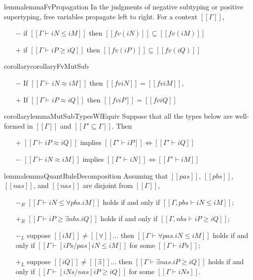 \begin{restatable}{lemma}{lemmaFvPropagation}
    \label{lemma:fv-propagation}
    In the judgments of negative subtyping or positive supertyping,
    free variables propagate left to right. For a context $[[Γ]]$,
    \begin{itemize}
        \item [$-$] if $[[Γ ⊢ iN ≤ iM]]$ then $[[fv(iN)]] \subseteq [[fv(iM)]]$
        \item [$+$] if $[[Γ ⊢ iP ≥ iQ]]$ then $[[fv(iP)]] \subseteq [[fv(iQ)]]$
    \end{itemize}
\end{restatable}

\begin{restatable}{corollary}{corollaryFvMutSub}
    \label{corollary:fv-mut-sub}
    \hfill
    \begin{itemize}
        \item [$-$] If $[[Γ ⊢ iN ≈ iM]]$ then $[[fv iN]] = [[fv iM]]$, 
        \item [$+$] If $[[Γ ⊢ iP ≈ iQ]]$ then $[[fv iP]] = [[fv iQ]]$
    \end{itemize}
\end{restatable}

\begin{restatable}{corollary}{lemmaMutSubTypesWfEquiv}
    \label{lemma:mut-sub-types-wf-equiv}
    Suppose that all the types below are well-formed in $[[Γ]]$ and
    $[[Γ' ⊆ Γ]]$. Then
    \begin{itemize}
    \item[$+$] $[[Γ ⊢ iP ≈ iQ]]$ implies $[[Γ' ⊢ iP]] \iff [[Γ' ⊢ iQ]]$
    \item[$-$] $[[Γ ⊢ iN ≈ iM]]$ implies $[[Γ' ⊢ iN]] \iff [[Γ' ⊢ iM]]$
    \end{itemize}
\end{restatable}

\begin{restatable}{lemma}{lemmaQuantRuleDecomposition}
    \label{lemma:quant-rule-decomposition}
    Assuming that $[[pas]]$, $[[pbs]]$, $[[nas]]$, and $[[nas]]$ are disjoint from $[[Γ]]$,
    \begin{itemize}
        \item [$-_{R}$] $[[Γ ⊢ iN ≤ ∀pbs.iM]]$ holds if and only if $[[Γ, pbs ⊢ iN ≤ iM]]$;
        \item [$+_{R}$] $[[Γ ⊢ iP ≥ ∃nbs.iQ]]$ holds if and only if $[[Γ, nbs ⊢ iP ≥ iQ]]$;
        \item [$-_{L}$] suppose $[[iM]] \neq [[∀]]\dots$
            then $[[Γ ⊢ ∀pas.iN ≤ iM]]$ holds if and only if $[[Γ ⊢ [iPs/pas]iN ≤ iM]]$
            for some $[[Γ ⊢ iPs]]$;
        \item [$+_{L}$] suppose $[[iQ]] \neq [[∃]]\dots$
            then $[[Γ ⊢ ∃nas.iP ≥ iQ]]$ holds if and only if $[[Γ ⊢ [iNs/nas]iP ≥ iQ]]$
            for some $[[Γ ⊢ iNs]]$.
    \end{itemize}
\end{restatable}


